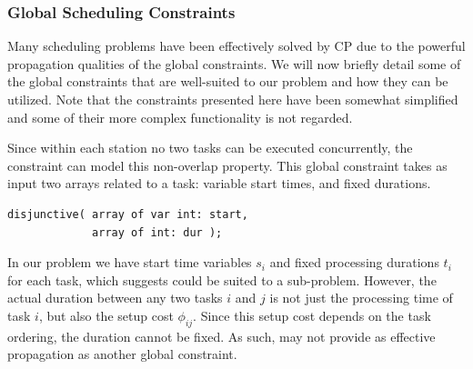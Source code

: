 \subsubsection{Global Scheduling Constraints}
\label{sec:bend:cpGlob}
Many scheduling problems have been effectively solved
by CP due to the powerful propagation qualities
of the global constraints.
We will now briefly detail some of the global constraints
that are well-suited to our problem
and how they can be utilized.
Note that the constraints presented here
have been somewhat simplified and some of their
more complex functionality is not regarded.

Since within each station no two tasks can be executed
concurrently, the \newline\disj constraint can model this non-overlap property.
This global constraint takes as input two arrays related to a
task: variable start times, 
and fixed durations.
\begin{lstlisting}[language=minizinc]
disjunctive( array of var int: start,
             array of int: dur );
\end{lstlisting}%
In our problem we have start time variables $s_i$
and fixed processing durations $t_i$ for each task,
which suggests \disj could be suited to a sub-problem.
However, the actual duration between any two tasks
$i$ and $j$ is not just the processing time of task $i$,
but also the setup cost $\phi_{ij}$.
Since this setup cost depends on the task ordering, the
duration cannot be fixed.
As such, \disj may not provide as effective propagation
as another global constraint.


